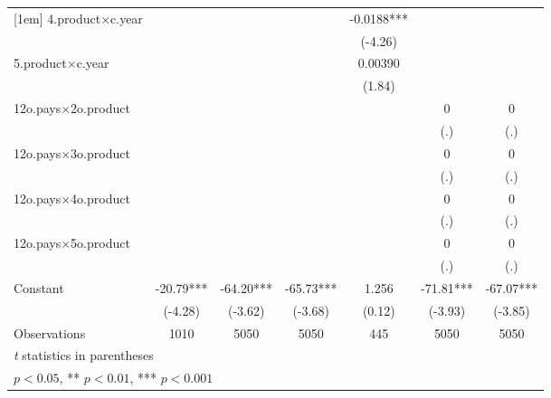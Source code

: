 {\begin{tabular}{l*{6}{c}}
[1em]
4.product$\times$c.year    &                     &                     &                     &     -0.0188***&                     &                     \\
                    &                     &                     &                     &     (-4.26)         &                     &                     \\
[1em]
5.product$\times$c.year    &                     &                     &                     &     0.00390         &                     &                     \\
                    &                     &                     &                     &      (1.84)         &                     &                     \\
[1em]
12o.pays$\times$2o.product &                     &                     &                     &                     &           0         &           0         \\
                    &                     &                     &                     &                     &         (.)         &         (.)         \\
[1em]
12o.pays$\times$3o.product &                     &                     &                     &                     &           0         &           0         \\
                    &                     &                     &                     &                     &         (.)         &         (.)         \\
[1em]
12o.pays$\times$4o.product &                     &                     &                     &                     &           0         &           0         \\
                    &                     &                     &                     &                     &         (.)         &         (.)         \\
[1em]
12o.pays$\times$5o.product &                     &                     &                     &                     &           0         &           0         \\
                    &                     &                     &                     &                     &         (.)         &         (.)         \\
[1em]
Constant            &      -20.79***&      -64.20***&      -65.73***&       1.256         &      -71.81***&      -67.07***\\
                    &     (-4.28)         &     (-3.62)         &     (-3.68)         &      (0.12)         &     (-3.93)         &     (-3.85)         \\
\hline
Observations        &        1010         &        5050         &        5050         &         445         &        5050         &        5050         \\
\hline\hline
\multicolumn{7}{l}{\footnotesize \textit{t} statistics in parentheses}\\
\multicolumn{7}{l}{\footnotesize * \(p<0.05\), ** \(p<0.01\), *** \(p<0.001\)}\\
\end{tabular}
}
